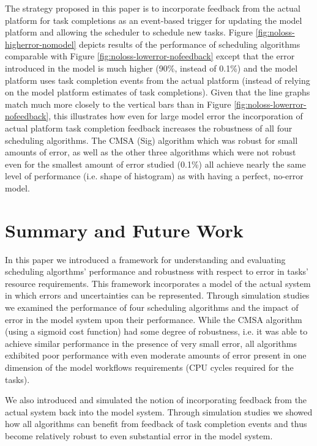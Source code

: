 \documentclass[10pt]{csce}
\begin{document}
The strategy proposed in this paper is to incorporate feedback from the actual
platform for task completions as an event-based trigger for updating the
model platform and allowing the scheduler to schedule new tasks.  Figure
\ref{fig:noloss-higherror-nomodel} depicts results of the performance of
scheduling algorithms comparable with Figure
\ref{fig:noloss-lowerror-nofeedback} except that the error introduced in the
model is much higher (90\%, instead of 0.1\%) and the model platform uses task
completion events from the actual platform (instead of relying on the model
platform estimates of task completions).  Given that the line graphs match
much more closely to the vertical bars than in Figure
\ref{fig:noloss-lowerror-nofeedback}, this illustrates how even for large
model error the incorporation of actual platform task completion feedback
increases the robustness of all four scheduling algorithms.  The CMSA (Sig)
algorithm which was robust for small amounts of error, as well as the other
three algorithms which were not robust even for the smallest amount of error
studied (0.1\%) all achieve nearly the same level of performance (i.e. shape
of histogram) as with having a perfect, no-error model.


\section{Summary and Future Work}
\label{sec:Summary}

In this paper we introduced a framework for understanding and evaluating
scheduling algorthms' performance and robustness with
respect to error in tasks' resource requirements.  This framework
incorporates a model of the actual system in which errors and uncertainties can
be represented.  Through simulation studies we examined the performance of four
scheduling algorithms and the impact of error in the model system upon their
performance.  While the CMSA algorithm (using a sigmoid cost function) had some
degree of robustness, i.e. it was able to achieve similar performance in the
presence of very small error, all algorithms exhibited poor performance with
even moderate amounts of error present in one dimension of the model workflows
requirements (CPU cycles required for the tasks).

We also introduced and simulated the notion of incorporating feedback from
the actual system back into the model system.  Through simulation studies we
showed how all algorithms can benefit from feedback of task completion events
and thus become relatively robust to even substantial error in the model
system.
\end{document}
